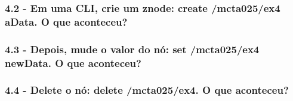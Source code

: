 \subsubsection{4.2 - Em uma CLI, crie um znode: create /mcta025/ex4 aData. O que
aconteceu?}

\subsubsection{4.3 - Depois, mude o valor do nó: set /mcta025/ex4 newData. O que
aconteceu?}

\subsubsection{4.4 - Delete o nó: delete /mcta025/ex4. O que aconteceu?}
